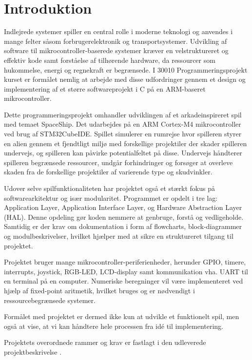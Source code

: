 \chapter{Introduktion} \label{chap:intro}

Indlejrede systemer spiller en central rolle i moderne teknologi og anvendes i mange felter såsom forbrugerelektronik og transportsystemer. Udvikling af software til mikrocontroller-baserede systemer kræver en velstruktureret og effektiv kode samt forståelse af tilhørende hardware, da ressourcer som hukommelse, energi og regnekraft er begrænsede. I 30010 Programmeringsprojekt kurset er formålet nemlig at arbejde med disse udfordringer gennem et design og implementering af et større softwareprojekt i C på en ARM-baseret mikrocontroller.

Dette programmeringsprojekt omhandler udviklingen af et arkadeinspireret spil med temaet SpaceShip. Det udarbejdes på en ARM Cortex-M4 mikrocontroller ved brug af STM32CubeIDE. Spillet simulerer en rumrejse hvor spilleren styrer en alien gennem et fjendtligt miljø med forskellige projektiler der skader spilleren undervejs, og spilleren kan påvirke potentialfeltet på disse. Undervejs håndterer spilleren begrænsede ressourcer, undgår forhindringer og forsøger at overleve skaden fra de forskellige projektiler af varierende type og skudvinkler.

Udover selve spilfunktionaliteten har projektet også et stærkt fokus på softwarearkitektur og især modularitet. Programmet er opdelt i tre lag: Application Layer, Application Interface Layer, og Hardware Abstraction Layer (HAL). Denne opdeling gør koden nemmere at genbruge, forstå og vedligeholde. Samtidig er der krav om dokumentation i form af flowcharts, block-diagrammer og modulbeskrivelser, hvilket hjælper med at sikre en struktureret tilgang til projektet.

Projektet bruger mange mikrocontroller-periferienheder, herunder GPIO, timere, interrupts, joystick, RGB-LED, LCD-display samt kommunikation vha. UART til en terminal på en computer. Numeriske beregninger vil være implementeret ved hjælp af fixed-point aritmetik, hvilket bruges og er nødvendigt i ressourcebegrænsede systemer.

Formålet med projektet er dermed ikke kun at udvikle et funktionelt spil, men også at vise, at vi kan håndtere hele processen fra idé til implementering.

Projektets overordnede rammer og krav er fastlagt i den udleverede projektbeskrivelse \cite{DTU30010ProjectDescription}.